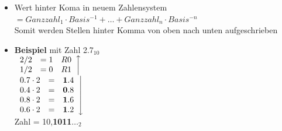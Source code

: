 \begin{multicols}{2}
\begin{itemize}
	\item [] Wert hinter Koma in neuem Zahlensystem $= Ganzzahl_{1}\cdot Basis^{-1} + \dots+ Ganzzahl_n\cdot Basis^{-n}$\\
		Somit werden Stellen hinter Komma von oben nach unten aufgeschrieben

	\item [] \textbf{Beispiel} mit Zahl 2.7$_{10}$\\
		$\left.\begin{array}{ccc}
			2 / 2 & = 1 & R 0\\
			1 / 2 & = 0 & R 1
		\end{array}\right\uparrow$\\
		$\left.\begin{array}{cccl}
			0.7 \cdot 2 &= &\mathbf{1}.4\\
			0.4 \cdot 2 &= &\mathbf{0}.8\\
			0.8 \cdot 2 &= & \mathbf{1}.6\\
			0.6 \cdot 2 &= & \mathbf{1}.2\\
		\end{array}\right\downarrow$\\
		
		Zahl = 10,\textbf{1011}$\dots_2$ \\
	\end{itemize}
\end{multicols}
\vspace{-20pt}
